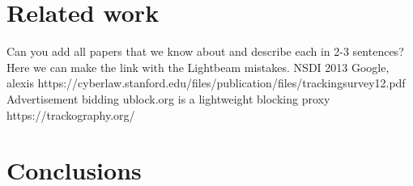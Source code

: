\documentclass{sig-alternate}
\begin{document}
\section{Related work}
{\color{red}Can you add all papers that we know about and describe each in 2-3 sentences? Here we can make the link with the Lightbeam mistakes.}
NSDI 2013 Google, alexis
https://cyberlaw.stanford.edu/files/publication/files/trackingsurvey12.pdf
Advertisement bidding
ublock.org is a lightweight blocking proxy
https://trackography.org/

\section{Conclusions} \label{sec:conclusions}



\end{document}
